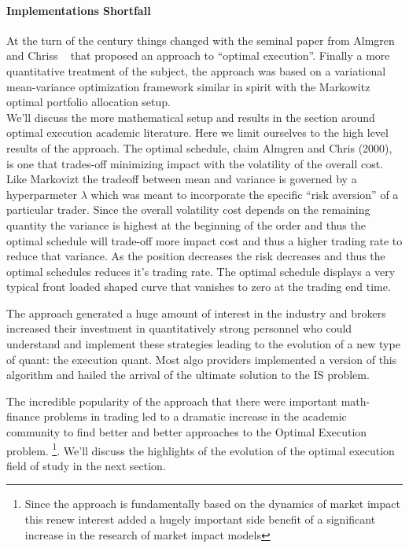 \paragraph{Implementations Shortfall}
At the turn of the century things changed with the seminal paper from Almgren and Chriss ~\cite{alm2000} that proposed an approach to ``optimal execution''. Finally a more quantitative treatment of the subject, the approach was based on a variational  mean-variance optimization framework similar in spirit with the Markowitz optimal portfolio allocation setup. \\
We'll discuss the more mathematical setup and results in the section around optimal execution academic literature. Here we limit ourselves to the high level results of the approach.
The optimal schedule, claim Almgren and Chris (2000), is one that trades-off minimizing impact with the volatility of the overall cost. Like Markovizt the tradeoff between mean and variance is governed by a hyperparmeter $\lambda$ which was meant to incorporate the specific ``risk aversion'' of a particular trader. Since the overall volatility cost depends on the remaining quantity the variance is highest at the beginning of the order and thus the optimal schedule will trade-off more impact cost and thus a higher trading rate to reduce that variance. As the position decreases the risk decreases and thus the optimal schedules reduces it's trading rate. The optimal schedule displays a very typical front loaded shaped curve that vanishes to zero at the trading end time.

The approach generated a huge amount of interest in the industry and  brokers increased their investment in quantitatively strong personnel who could understand and implement these strategies leading to the evolution of a new type of quant: the execution quant. Most algo providers implemented a version of this algorithm and hailed the arrival of the ultimate solution to the IS problem. 

The incredible popularity of the approach that there were important math-finance problems in trading led to a dramatic increase in the academic community to find better and better approaches to the Optimal Execution problem. \footnote{Since the approach is fundamentally based on the dynamics of market impact this renew interest added  a hugely important side benefit of a significant increase in the research of market impact models}. We'll discuss the highlights of the evolution of the optimal execution field of study in the next section. \\

